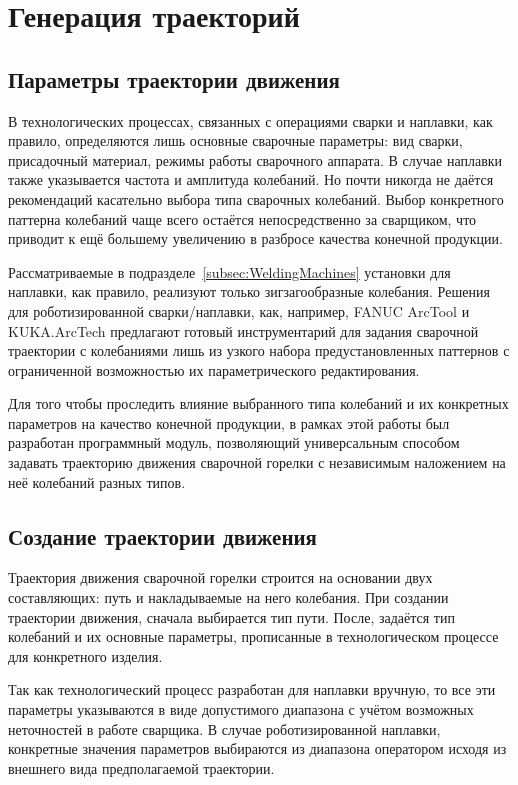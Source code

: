 \section{Генерация траекторий}

\subsection{Параметры траектории движения} \label{subsec:TrajectoryParameters}
В технологических процессах, связанных с операциями сварки и наплавки, как правило, определяются лишь основные сварочные параметры: вид сварки, присадочный материал, режимы работы сварочного аппарата.
В случае наплавки также указывается частота и амплитуда колебаний.
Но почти никогда не даётся рекомендаций касательно выбора типа сварочных колебаний.
Выбор конкретного паттерна колебаний чаще всего остаётся непосредственно за сварщиком, что приводит к ещё большему увеличению в разбросе качества конечной продукции.

Рассматриваемые в подразделе~\ref{subsec:WeldingMachines} установки для наплавки, как правило, реализуют только зигзагообразные колебания.
Решения для роботизированной сварки/наплавки, как, например, FANUC ArcTool и KUKA.ArcTech предлагают готовый инструментарий для задания сварочной траектории с колебаниями лишь из узкого набора предустановленных паттернов с ограниченной возможностью их параметрического редактирования.

Для того чтобы проследить влияние выбранного типа колебаний и их конкретных параметров на качество конечной продукции, в рамках этой работы был разработан программный модуль, позволяющий универсальным способом задавать траекторию движения сварочной горелки с независимым наложением на неё колебаний разных типов.

\subsection{Создание траектории движения}
Траектория движения сварочной горелки строится на основании двух составляющих: путь и накладываемые на него колебания.
При создании траектории движения, сначала выбирается тип пути.
После, задаётся тип колебаний и их основные параметры, прописанные в технологическом процессе для конкретного изделия.

Так как технологический процесс разработан для наплавки вручную, то все эти параметры указываются в виде допустимого диапазона с учётом возможных неточностей в работе сварщика.
В случае роботизированной наплавки, конкретные значения параметров выбираются из диапазона оператором исходя из внешнего вида предполагаемой траектории.

